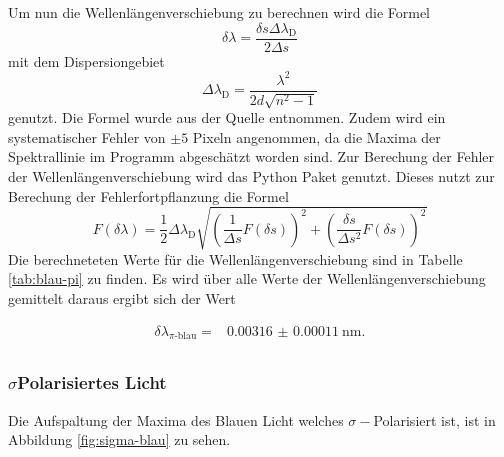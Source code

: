 Um nun die Wellenlängenverschiebung zu berechnen wird die Formel
\begin{equation}
    \delta \lambda = \frac{\delta s \Delta \lambda _\text{D}}{2\Delta s}
   \label{eq:Wellenlaengenverschiebung}
\end{equation}
mit dem Dispersiongebiet
\begin{equation*}
    \Delta \lambda _\text{D} = \frac{\lambda^2}{2d\sqrt{n^2-1}}
\end{equation*}
genutzt. Die Formel wurde aus der Quelle \cite[4]{anleitung} entnommen.
Zudem wird ein systematischer Fehler von $\pm 5$ Pixeln angenommen, da die Maxima der Spektrallinie im Programm \cite{paint3d} abgeschätzt worden sind.
Zur Berechung der Fehler der Wellenlängenverschiebung wird das Python Paket \cite{uncertainties} genutzt.
Dieses nutzt zur Berechung der Fehlerfortpflanzung die Formel
\begin{equation}
    F(\delta \lambda) = \frac{1}{2} \Delta \lambda _\text{D} \sqrt{\left (\frac{1}{\Delta s} F(\delta s) \right)^2 + \left ( \frac{\delta s}{\Delta s^2} F(\delta s) \right )^2}
    \label{eq:fehler_Wellenlängenverschiebung}
\end{equation}
Die berechneteten Werte für die Wellenlängenverschiebung sind in Tabelle \autoref{tab:blau-pi} zu finden.
Es wird über alle Werte der Wellenlängenverschiebung gemittelt daraus ergibt sich der Wert

\begin{align*}
    \delta \lambda _\text{$\pi$-blau} = & \SI{0.00316(011)}{\nano\meter}. \\
\end{align*}

\subsubsection{\texorpdfstring{$\sigma$}-Polarisiertes Licht}

Die Aufspaltung der Maxima des Blauen Licht welches $\sigma -$Polarisiert ist, ist in Abbildung \ref{fig:sigma-blau} zu sehen.

